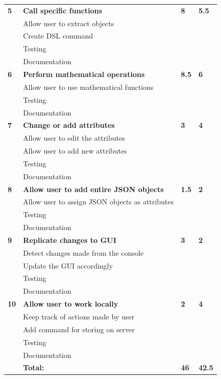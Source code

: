 \begin{table}
\begin{tabular}{ l p{8cm} l l }
 \bf{5}	  &\bf{Call specific functions}					&\bf{8}		&\bf{5.5}		     \\
		  &Allow user to extract objects				&			&		\\
		  &Create DSL command						&			&		\\
		  &Testing								&			&		\\
		  &Documentation							&			&		\\

\bf{6}	  &\bf{Perform mathematical operations}			&\bf{8.5}		&\bf{6}		     \\
		  &Allow user to use mathematical functions		&			&		\\
		  &Testing								&			&		\\
		  &Documentation							&			&		\\

\bf{7}   	&\bf{Change or add attributes}				&\bf{3}		&\bf{4}		     \\ 
		  &Allow user to edit the attributes				&			&		\\
		  &Allow user to add new attributes				&			&		\\
		  &Testing								&			&		\\
		  &Documentation							&			&		\\

\bf{8}   	&\bf{Allow user to add entire JSON objects}			&\bf{1.5}		&\bf{2}		     \\ 
		  &Allow user to assign JSON objects as attributes		&			&		\\
		  &Testing									&			&		\\
		  &Documentation								&			&		\\

\bf{9}   	&\bf{Replicate changes to GUI}				&\bf{3}		&\bf{2}		     \\ 
		  &Detect changes made from the console		&			&		\\
		  &Update the GUI accordingly					&			&		\\
		  &Testing								&			&		\\
		  &Documentation							&			&		\\

\bf{10}   	&\bf{Allow user to work locally}				&\bf{2}		&\bf{4}		     \\ 
		  &Keep track of actions made by user			&			&		\\
		  &Add command for storing on server			&			&		\\
		  &Testing								&			&		\\
		  &Documentation							&			&		\\

\hline 
		  &\bf{Total:}						&\bf{46}		&\bf{42.5}		\\
\hline
\end{tabular}
\label{table:sp3backlog}
\end{table}




